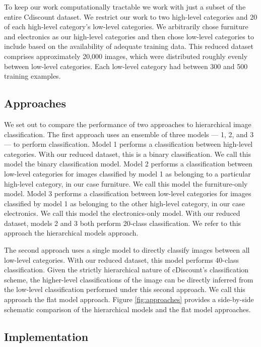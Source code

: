 To keep our work computationally tractable we work with just a subset of the entire Cdiscount dataset.
We restrict our work to two high-level categories and 20 of each high-level category's low-level categories.
We arbitrarily chose furniture and electronics as our high-level categories and then chose low-level categories to include based on the availability of adequate training data.
This reduced dataset comprises approximately 20,000 images, which were distributed roughly evenly between low-level categories.
Each low-level category had between 300 and 500 training examples.


\subsection{Approaches}


We set out to compare the performance of two approaches to hierarchical image classification.
The first approach uses an ensemble of three models --- 1, 2, and 3 --- to perform classification.
Model 1 performs a classification between high-level categories.
With our reduced dataset, this is a binary classification.
We call this model the binary classification model.
Model 2 performs a classification between low-level categories for images classified by model 1 as belonging to a particular high-level category, in our case furniture.
We call this model the furniture-only model.
Model 3 performs a classification between low-level categories for images classified by model 1 as belonging to the other high-level category, in our case electronics.
We call this model the electronics-only model.
With our reduced dataset, models 2 and 3 both perform 20-class classification.
We refer to this approach the hierarchical models approach.

The second approach uses a single model to directly classify images between all low-level categories.
With our reduced dataset, this model performs 40-class classification.
Given the strictly hierarchical nature of cDiscount's classification scheme, the higher-level classifications of the image can be directly inferred from the low-level classification performed under this second approach. 
We call this approach the flat model approach.
Figure \ref{fig:approaches} provides a side-by-side schematic comparison of the hierarchical models and the flat model approaches.

\subsection{Implementation}

